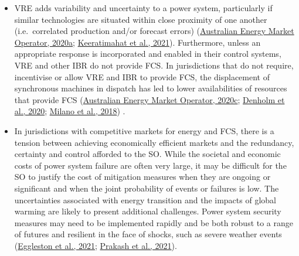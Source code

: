 \documentclass[12pt,a4paper,]{report}
\begin{document}
\begin{itemize}
\item
  VRE adds variability and uncertainty to a power system, particularly
  if similar technologies are situated within close proximity of one
  another (i.e.~correlated production and/or forecast errors)
  (\protect\hyperlink{ref-australianenergymarketoperatorRenewableIntegrationStudy2020}{Australian
  Energy Market Operator, 2020a};
  \protect\hyperlink{ref-keeratimahatAnalysisShorttermOperational2021}{Keeratimahat
  et al., 2021}). Furthermore, unless an appropriate response is
  incorporated and enabled in their control systems, VRE and other IBR
  do not provide FCS. In jurisdictions that do not require, incentivise
  or allow VRE and IBR to provide FCS, the displacement of synchronous
  machines in dispatch has led to lower availabilities of resources that
  provide FCS
  (\protect\hyperlink{ref-australianenergymarketoperatorRenewableIntegrationStudy2020c}{Australian
  Energy Market Operator, 2020c};
  \protect\hyperlink{ref-denholmInertiaPowerGrid2020}{Denholm et al.,
  2020};
  \protect\hyperlink{ref-milanoFoundationsChallengesLowInertia2018}{Milano
  et al., 2018}) .
\item
  In jurisdictions with competitive markets for energy and FCS, there is
  a tension between achieving economically efficient markets and the
  redundancy, certainty and control afforded to the SO. While the
  societal and economic costs of power system failure are often very
  large, it may be difficult for the SO to justify the cost of
  mitigation measures when they are ongoing or significant and when the
  joint probability of events or failures is low. The uncertainties
  associated with energy transition and the impacts of global warming
  are likely to present additional challenges. Power system security
  measures may need to be implemented rapidly and be both robust to a
  range of futures and resilient in the face of shocks, such as severe
  weather events
  (\protect\hyperlink{ref-egglestonSecurityResilienceTechnical2021}{Eggleston
  et al., 2021};
  \protect\hyperlink{ref-prakashResponseFrequencyControl2021}{Prakash et
  al., 2021}).
\end{itemize}
\end{document}
